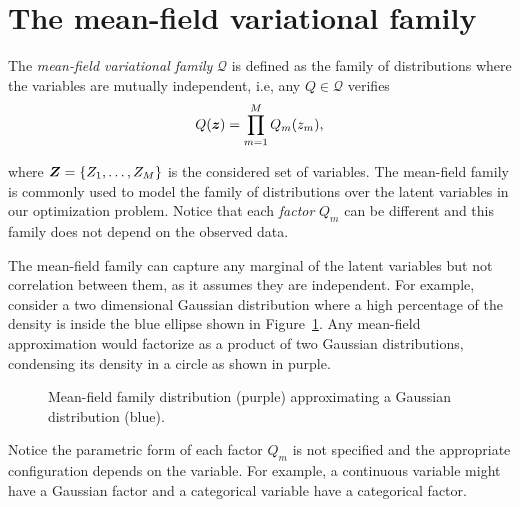 \section{The mean-field variational family}

The \emph{mean-field variational family} \(\mathcal{Q}\) is defined as the family of distributions where the variables are mutually independent, i.e, any \(Q \in \mathcal{Q}\) verifies
\[
  Q(\bm{z}) = \prod_{m=1}^{M}Q_{m}(z_{m}),
\]

where \(\bm{Z} = \{Z_{1},\dots,Z_{M}\}\) is the considered set of variables. The mean-field family is commonly used to model the family of distributions over the latent variables in our optimization problem. Notice that each \emph{factor} \(Q_{m}\) can be different and this family does not depend on the observed data.

The mean-field family can capture any marginal of the latent variables but not correlation between them, as it assumes they are independent. For example, consider a two dimensional Gaussian distribution where a high percentage of the density is inside the blue ellipse shown in Figure~\ref{fig:mean_field}. Any mean-field approximation would factorize as a product of two Gaussian distributions, condensing its density in a circle as shown in purple.

\begin{figure}[h!]
\centering
{}
  \caption{Mean-field family distribution (purple) approximating a Gaussian distribution (blue).}\label{fig:mean_field}
\end{figure}

Notice the parametric form of each factor \(Q_{m}\) is not specified and the appropriate configuration depends on the variable. For example, a continuous variable might have a Gaussian factor and a categorical variable have a categorical factor.

